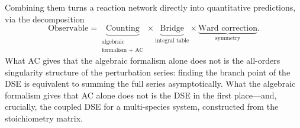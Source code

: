 \documentclass[11pt,a4paper]{article}
\theoremstyle{plain}
\begin{document}
Combining them turns a reaction network directly into quantitative
predictions, via the decomposition
\begin{equation}\label{eq:decomposition}
  \text{Observable}
  = \underbrace{\text{Counting}}_{\substack{\text{algebraic}\\\text{formalism + AC}}}
  \times \underbrace{\text{Bridge}}_{\text{integral table}}
  \times \underbrace{\text{Ward correction}}_{\text{symmetry}}.
\end{equation}
What AC gives that the algebraic formalism alone does not is the
all-orders singularity structure of the perturbation series:
finding the branch point of the DSE is equivalent to summing the
full series asymptotically.  What the algebraic formalism gives
that AC alone does not is the DSE in the first place---and,
crucially, the coupled DSE for a multi-species system,
constructed from the stoichiometry matrix.
\end{document}
